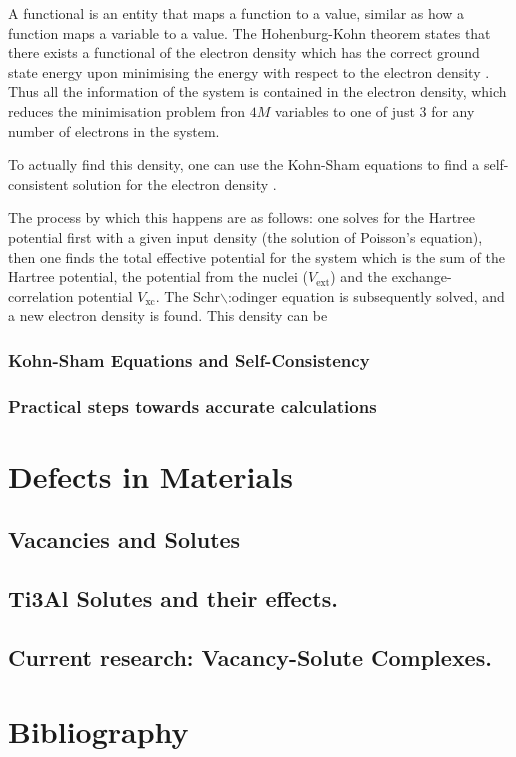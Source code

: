 \documentclass[11pt]{article}
\begin{document}
A functional is an entity that maps a function to a value, similar as how a function maps a
variable to a value. The Hohenburg-Kohn theorem states that there exists a functional of the
electron density which has the correct ground state energy upon minimising the energy with respect to
the electron density \cite{hohenburg64_inhomog_electron_gas}. Thus all the information of the
system is contained in the electron density, which reduces the minimisation
problem fron \(4M\) variables to one of just 3 for any number of electrons in the system. 

To actually find this density, one can use the Kohn-Sham equations to find a self-consistent
solution for the electron density \cite{kohn65_self_cons_eq}. 

The process by which this happens are as follows: one solves for the Hartree potential first with a
given input density (the solution of Poisson's equation), then one finds the total effective potential
for the system which is the sum of the Hartree potential, the potential from the nuclei
(\(V_{\text{ext}}\)) and the exchange-correlation potential \(V_{\text{xc}}\). The Schr$\backslash$:odinger
equation is subsequently solved, and a new electron density is found. This density can be


\subsubsection{Kohn-Sham Equations and Self-Consistency}
\label{sec:org1718ece}


\subsubsection{Practical steps towards accurate calculations}
\label{sec:org1e28192}



\section{Defects in Materials}
\label{sec:org5ce0c38}

\subsection{Vacancies and Solutes}
\label{sec:org902b141}

\subsection{Ti3Al Solutes and their effects.}
\label{sec:org3b3b3eb}

\subsection{Current research: Vacancy-Solute Complexes.}
\label{sec:orge713c5f}


\section{Bibliography}
\label{sec:org9b79d7b}
\label{org059e6ef}



\end{document}
